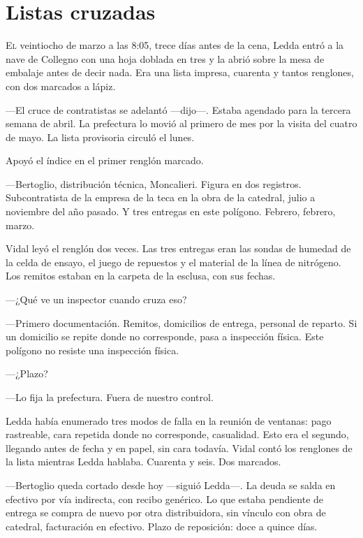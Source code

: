 \clearpage

\chapter{Listas cruzadas}

\lettrine[lines=2, lhang=0.1, nindent=0.2em]{E}{l} veintiocho de marzo a las 8:05, trece días antes de la cena, Ledda entró a la nave de Collegno con una hoja doblada en tres y la abrió sobre la mesa de embalaje antes de decir nada. Era una lista impresa, cuarenta y tantos renglones, con dos marcados a lápiz.


---El cruce de contratistas se adelantó ---dijo---. Estaba agendado para la tercera semana de abril. La prefectura lo movió al primero de mes por la visita del cuatro de mayo. La lista provisoria circuló el lunes.

Apoyó el índice en el primer renglón marcado.

---Bertoglio, distribución técnica, Moncalieri. Figura en dos registros. Subcontratista de la empresa de la teca en la obra de la catedral, julio a noviembre del año pasado. Y tres entregas en este polígono. Febrero, febrero, marzo.

Vidal leyó el renglón dos veces. Las tres entregas eran las sondas de humedad de la celda de ensayo, el juego de repuestos y el material de la línea de nitrógeno. Los remitos estaban en la carpeta de la esclusa, con sus fechas.

---¿Qué ve un inspector cuando cruza eso?

---Primero documentación. Remitos, domicilios de entrega, personal de reparto. Si un domicilio se repite donde no corresponde, pasa a inspección física. Este polígono no resiste una inspección física.

---¿Plazo?

---Lo fija la prefectura. Fuera de nuestro control.

Ledda había enumerado tres modos de falla en la reunión de ventanas: pago rastreable, cara repetida donde no corresponde, casualidad. Esto era el segundo, llegando antes de fecha y en papel, sin cara todavía. Vidal contó los renglones de la lista mientras Ledda hablaba. Cuarenta y seis. Dos marcados.

---Bertoglio queda cortado desde hoy ---siguió Ledda---. La deuda se salda en efectivo por vía indirecta, con recibo genérico. Lo que estaba pendiente de entrega se compra de nuevo por otra distribuidora, sin vínculo con obra de catedral, facturación en efectivo. Plazo de reposición: doce a quince días.

